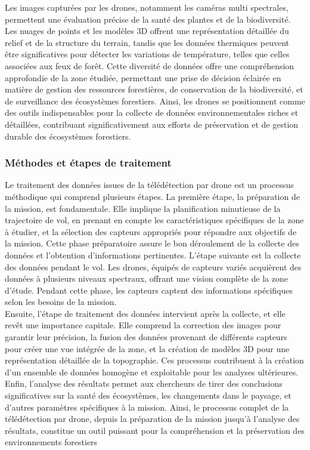 Les images capturées par les drones, notamment les caméras multi spectrales, permettent une évaluation précise de la santé des plantes et de la biodiversité. Les nuages de points et les modèles 3D offrent une représentation détaillée du relief et de la structure du terrain, tandis que les données thermiques peuvent être significatives pour détecter les variations de température, telles que celles associées aux feux de forêt. Cette diversité de données offre une compréhension approfondie de la zone étudiée, permettant une prise de décision éclairée en matière de gestion des ressources forestières, de conservation de la biodiversité, et de surveillance des écosystèmes forestiers. Ainsi, les drones se positionnent comme des outils indispensables pour la collecte de données environnementales riches et détaillées, contribuant significativement aux efforts de préservation et de gestion durable des écosystèmes forestiers.

\subsubsection{Méthodes et étapes de traitement}
Le traitement des données issues de la télédétection par drone est un processus méthodique qui comprend plusieurs étapes. La première étape, la préparation de la mission, est fondamentale. Elle implique la planification minutieuse de la trajectoire de vol, en prenant en compte les caractéristiques spécifiques de la zone à étudier, et la sélection des capteurs appropriés pour répondre aux objectifs de la mission. Cette phase préparatoire assure le bon déroulement de la collecte des données et l'obtention d'informations pertinentes. L’étape suivante est la collecte des données pendant le vol. Les drones, équipés de capteurs variés acquièrent des données à plusieurs niveaux spectraux, offrant une vision complète de la zone d'étude. Pendant cette phase, les capteurs captent des informations spécifiques selon les besoins de la mission. 
\\

Ensuite, l'étape de traitement des données intervient après la collecte, et elle revêt une importance capitale. Elle comprend la correction des images pour garantir leur précision, la fusion des données provenant de différents capteurs pour créer une vue intégrée de la zone, et la création de modèles 3D pour une représentation détaillée de la topographie. Ces processus contribuent à la création d'un ensemble de données homogène et exploitable pour les analyses ultérieures. Enfin, l'analyse des résultats permet aux chercheurs de tirer des conclusions significatives sur la santé des écosystèmes, les changements dans le paysage, et d'autres paramètres spécifiques à la mission. Ainsi, le processus complet de la télédétection par drone, depuis la préparation de la mission jusqu'à l'analyse des résultats, constitue un outil puissant pour la compréhension et la préservation des environnements forestiers

